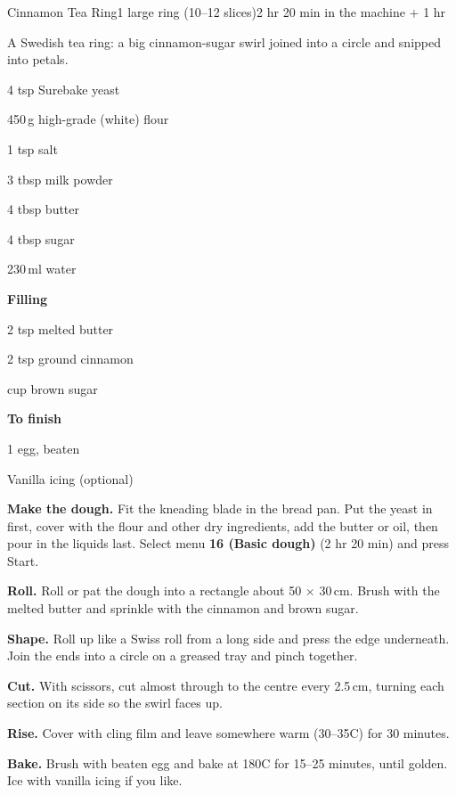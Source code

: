 \begin{recipebox}{Cinnamon Tea Ring}{1 large ring (10--12 slices)}{2 hr 20 min in the machine + 1 hr}

A Swedish tea ring: a big cinnamon-sugar swirl joined into a circle and snipped into petals.

\begin{ingredients}
  \item 4 tsp Surebake yeast
  \item 450\,g high-grade (white) flour
  \item 1 tsp salt
  \item 3 tbsp milk powder
  \item 4 tbsp butter
  \item 4 tbsp sugar
  \item 230\,ml water
  \item[] \textbf{Filling}
  \item 2 tsp melted butter
  \item 2 tsp ground cinnamon
  \item {} cup brown sugar
  \item[] \textbf{To finish}
  \item 1 egg, beaten
  \item Vanilla icing (optional)
\end{ingredients}

\begin{method}
  \item \textbf{Make the dough.} Fit the kneading blade in the bread pan. Put the yeast in first, cover with the flour and other dry ingredients, add the butter or oil, then pour in the liquids last. Select menu \textbf{16 (Basic dough)} (2 hr 20 min) and press Start.
  \item \textbf{Roll.} Roll or pat the dough into a rectangle about 50 $\times$ 30\,cm. Brush with the melted butter and sprinkle with the cinnamon and brown sugar.
  \item \textbf{Shape.} Roll up like a Swiss roll from a long side and press the edge underneath. Join the ends into a circle on a greased tray and pinch together.
  \item \textbf{Cut.} With scissors, cut almost through to the centre every 2.5\,cm, turning each section on its side so the swirl faces up.
  \item \textbf{Rise.} Cover with cling film and leave somewhere warm (30--35\degree C) for 30 minutes.
  \item \textbf{Bake.} Brush with beaten egg and bake at 180\degree C for 15--25 minutes, until golden. Ice with vanilla icing if you like.
\end{method}


\end{recipebox}
